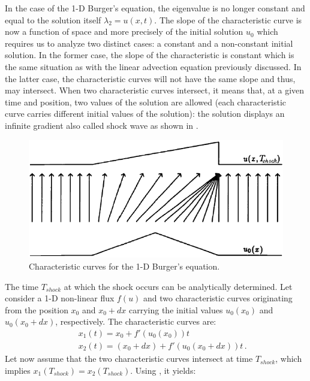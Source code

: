 %
In the case of the 1-D Burger's equation, the eigenvalue is no longer constant and equal to the solution itself $\lambda_2 = u(x,t)$. The slope of the characteristic curve is now a function of space and more precisely of the initial solution $u_0$ which requires us to analyze two distinct cases: a constant and a non-constant initial solution. In the former case, the slope of the characteristic is constant which is the same situation as with the linear advection equation previously discussed. In the latter case, the characteristic curves will not have the same slope and thus, may intersect. When two characteristic curves intersect, it means that, at a given time and position, two values of the solution are allowed (each characteristic curve carries different initial values of the solution): the solution displays an infinite gradient also called shock wave as shown in . 
%
\begin{figure}[H]
\centering
\includegraphics[width=\textwidth]{figures/shock_formation_burger.png}
\caption{Characteristic curves for the 1-D Burger's equation.}
\label{fig:char_curve_bg_sct1b}
\end{figure}
%
The time $T_{shock}$ at which the shock occurs can be analytically determined. Let consider a 1-D non-linear flux $f(u)$ and two characteristic curves originating from the position $x_0$ and $x_0+dx$ carrying the initial values $u_0(x_0)$ and $u_0(x_0+dx)$, respectively. The characteristic curves are:
%
\begin{eqnarray}\label{eq:cc1_sct1b}
&&x_1(t) = x_0 + f'(u_0(x_0)) t \nonumber \\ 
&&x_2(t) = (x_0 + dx) + f'(u_0(x_0+dx)) t \, .
\end{eqnarray}
%
Let now assume that the two characteristic curves intersect at time $T_{shock}$, which implies $x_1(T_{shock}) = x_2(T_{shock})$. Using , it yields:
